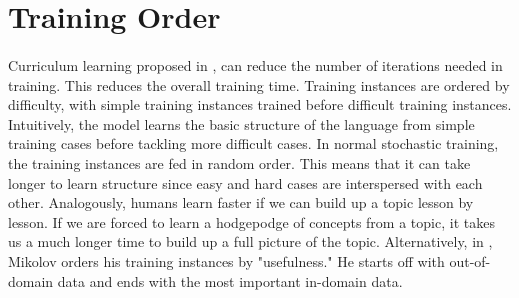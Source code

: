 \section{Training Order}
\paragraph{}
Curriculum learning proposed in \cite{Bengio2009}, can reduce the number of iterations needed in training. This reduces the overall training time. Training instances are ordered by difficulty, with simple training instances trained before difficult training instances. Intuitively, the model learns the basic structure of the language from simple training cases before tackling more difficult cases. In normal stochastic training, the training instances are fed in random order. This means that it can take longer to learn structure since easy and hard cases are interspersed with each other. Analogously, humans learn faster if we can build up a topic lesson by lesson. If we are forced to learn a hodgepodge of concepts from a topic, it takes us a much longer time to build up a full picture of the topic. Alternatively, in \cite{Mikolov2012}, Mikolov orders his training instances by "usefulness." He starts off with out-of-domain data and ends with the most important in-domain data.

